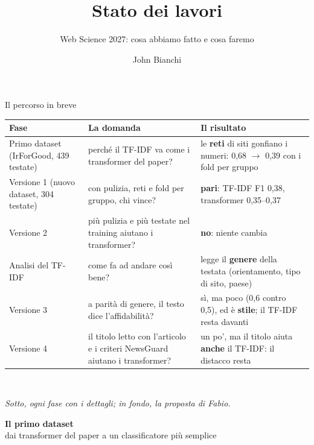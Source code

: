 \documentclass[aspectratio=169]{beamer}
\title[Stato dei lavori]{Stato dei lavori}
\subtitle{Web Science 2027: cosa abbiamo fatto e cosa faremo}
\author[John Bianchi]{John Bianchi}
\institute[]{IMT Lucca \& IIT-CNR Pisa}
\date{}
\newcommand{\hl}[1]{\textbf{#1}}
\newcommand{\divider}[2]{%
  \begin{frame}[plain]
    \vfill
    \begin{center}
      {\color{dividerblue}\Huge\textbf{#1}}\\[0.8em]
      {\large #2}
    \end{center}
    \vfill
  \end{frame}}
\begin{document}
\begin{frame}
  \titlepage
\end{frame}

\begin{frame}{Il percorso in breve}
  \vspace{0.2em}
  \centering\footnotesize
  \begin{tabular}{>{\raggedright\arraybackslash}p{}>{\raggedright\arraybackslash}p{}>{\raggedright\arraybackslash}p{}}
    \toprule
    \textbf{Fase} & \textbf{La domanda} & \textbf{Il risultato} \\
    \midrule
    Primo dataset (IrForGood, 439 testate) & perch\'e il TF-IDF va come i transformer del paper? & le \hl{reti} di siti gonfiano i numeri: 0,68 $\to$ 0,39 con i fold per gruppo \\
    \addlinespace
    Versione 1 (nuovo dataset, 304 testate) & con pulizia, reti e fold per gruppo, chi vince? & \hl{pari}: TF-IDF F1 0,38, transformer 0,35--0,37 \\
    \addlinespace
    Versione 2 & pi\`u pulizia e pi\`u testate nel training aiutano i transformer? & \hl{no}: niente cambia \\
    \addlinespace
    Analisi del TF-IDF & come fa ad andare cos\`i bene? & legge il \hl{genere} della testata (orientamento, tipo di sito, paese) \\
    \addlinespace
    Versione 3 & a parit\`a di genere, il testo dice l'affidabilit\`a? & s\`i, ma poco (0,6 contro 0,5), ed \`e \hl{stile}; il TF-IDF resta davanti \\
    \addlinespace
    Versione 4 & il titolo letto con l'articolo e i criteri NewsGuard aiutano i transformer? & un po', ma il titolo aiuta \hl{anche} il TF-IDF: il distacco resta \\
    \bottomrule
  \end{tabular}\\[0.6em]
  \raggedright{\small\itshape Sotto, ogni fase con i dettagli; in fondo, la proposta di Fabio.}
\end{frame}

\divider{Il primo dataset}{dai transformer del paper a un classificatore pi\`u semplice}
\end{document}
